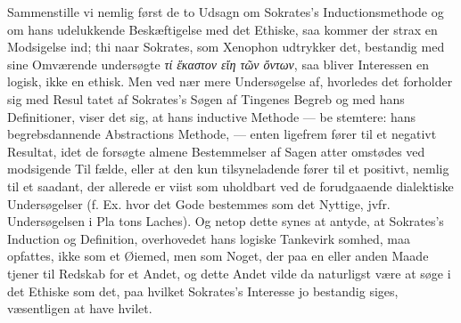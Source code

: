 \documentclass[12pt,a4paper]{book}
\newcommand{\gk}[1]{\textit{#1}}
\begin{document}
Sammenstille vi nemlig først de to Udsagn om Sokrates's
Inductionsmethode og om hans udelukkende Beskæftigelse med
det Ethiske, saa kommer der strax en Modsigelse ind; thi
naar Sokrates, som Xenophon udtrykker det, bestandig med
sine Omværende undersøgte \gk{τί ἕκαστον εἴη τῶν ὄντων}, saa
bliver Interessen en logisk, ikke en ethisk. Men ved nær\-%
mere Undersøgelse af, hvorledes det forholder sig med Resul\-%
tatet af Sokrates's Søgen af Tingenes Begreb og med hans
Definitioner, viser det sig, at hans inductive Methode --- be\-%
stemtere: hans begrebsdannende Abstractions Methode, --- enten
ligefrem fører til et negativt Resultat, idet de forsøgte almene
Bestemmelser af Sagen atter omstødes ved modsigende Til\-%
fælde, eller at den kun tilsyneladende fører til et positivt,
nemlig til et saadant, der allerede er viist som uholdbart ved
de forudgaaende dialektiske Undersøgelser (f. Ex. hvor det
Gode bestemmes som det Nyttige, jvfr. Undersøgelsen i Pla\-%
tons Laches). Og netop dette synes at antyde, at Sokrates's
Induction og Definition, overhovedet hans logiske Tankevirk\-%
somhed, maa opfattes, ikke som et Øiemed, men som Noget,
der paa en eller anden Maade tjener til Redskab for et
Andet, og dette Andet vilde da naturligst være at søge i det
Ethiske som det, paa hvilket Sokrates's Interesse jo bestandig
siges, væsentligen at have hvilet.
\end{document}
